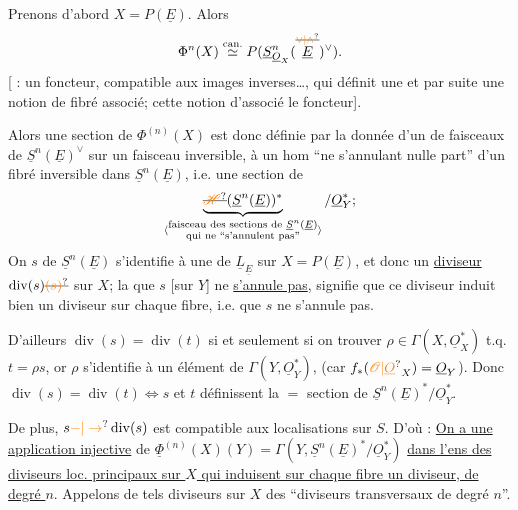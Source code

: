 Prenons d'abord $X=P(\underline{E})$. Alors
\[
\Phi^n(X)\overset{\text{can.}}{\simeq}P(\underline{S}^{n}_{\underline{O}_{X}}(\overset{\deleted{\unsure{\vee|\wedge}}}{\underline{E}})^{\vee}).
\]
[ :  un foncteur, compatible aux images inverses\ldots, qui définit une  et par suite une notion de fibré associé;  cette  notion d'associé  le foncteur].

 Alors une section de $\Phi^{(n)}(X)$ est donc définie par  la donnée d'un  de faisceaux de $\underline{S}^{n}(\underline{E})^{\vee}$ sur un  faisceau inversible,  à un hom ``ne s'annulant nulle part'' d'un fibré inversible dans $\underline{S}^{n}(\underline{E})$, i.e. une section de
\[
\underbrace{\deleted{\unsure{\mathscr{H}}}(\underline{S}^{n}(\underline{E}))^{*}}_{\inserted{\substack{\text{faisceau des sections de }\underline{S}^{n}(\underline{E})\\\text{qui ne ``s'annulent pas''}}}}/\underline{O}_{Y}^{*};
\]
On 
 $s$ de $\underline{S}^{n}(\underline{E})$ s'identifie à une  de $\underline{L}_{\underline{E}}$ sur $X=P(\underline{E})$, et   donc un \uline{diviseur} $\operatorname{div}(s)\deleted{\unsure{(s)}}$ sur $X$; la  que $s$ [sur $Y$] ne \uline{s'annule pas}, signifie que ce diviseur induit bien un diviseur sur chaque fibre,  i.e. que $s$ ne s'annule pas.

D'ailleurs  $\operatorname{div}(s)=\operatorname{div}(t)$  si et seulement si on  trouver $\rho\in\Gamma(X,\underline{O}_X^*)$ t.q. $t=\rho s$, or $\rho$ s'identifie à un élément de $\Gamma(Y,\underline{O}_Y^*)$, (car $f_*(\unsure{\mathscr{O}|\underline{O}}_X)=\underline{O}_Y$). Donc $\operatorname{div}(s)=\operatorname{div}(t)\Leftrightarrow s$ et $t$ définissent la $=$ section de $\underline{S}^{n}(\underline{E})^*/\underline{O}_Y^*$.

De plus, $s\unsure{-|\to}\operatorname{div}(s)$ est compatible aux localisations sur $S$. D'où : \uline{On a une application injective} de \deleted{$\unsure{\Phi|\varphi}$} $\underline{\Phi}^{(n)}(X)(Y)=\Gamma(Y,\underline{S}^{n}(\underline{E})^*/\underline{O}_Y^*)$ \uline{dans l'ens des diviseurs loc. principaux  sur $X$ qui induisent  sur chaque fibre un diviseur,  de degré $n$}. Appelons de tels diviseurs sur $X$ des ``diviseurs transversaux de degré $n$''.


